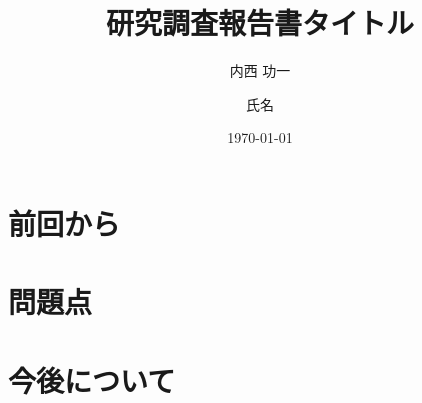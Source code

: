 \documentclass[11pt]{./lib/cs-thesis-kai}
\title{研究調査報告書}
\author{内西 功一}
\date{\today}
\title{タイトル}
\author{氏名}
\begin{document}
 

%
%
\titlepage
\makeatletter
\abstract



\tableofcontents
 \listoffigures
 \listoftables

\section{前回から}
\section{問題点}
\section{今後について}
\end{document}
